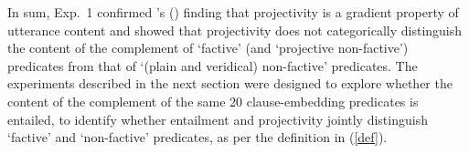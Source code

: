 \documentclass[11pt,fleqn]{article}
\newcommand{\6}{\mbox{$[\hspace*{-.6mm}[$}}
\newcommand{\9}{\mbox{$]\hspace*{-.6mm}]$}}
\newcommand{\citetpos}[1]{\citeauthor{#1}'s (\citeyear{#1})}
\begin{document}
In sum, Exp.~1 confirmed \citetpos{tbd-variability} finding that projectivity is a gradient property of utterance content and showed that projectivity does not categorically distinguish the content of the complement of `factive' (and `projective non-factive') predicates from that of `(plain and veridical) non-factive' predicates. The experiments described in the next section were designed to explore whether the content of the complement of the same 20 clause-embedding predicates is entailed, to identify whether entailment and projectivity jointly distinguish `factive' and `non-factive' predicates, as per the definition in (\ref{def}).









\end{document}
